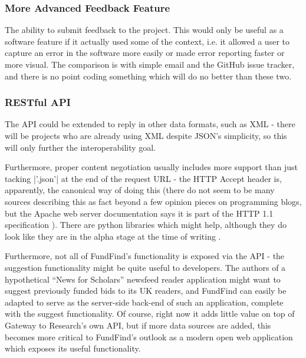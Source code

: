 \subsubsection{More Advanced Feedback Feature}
The ability to submit feedback to the project. This would only be useful as a software feature if it actually used some of the context, i.e. it allowed a user to capture an error in the software more easily or made error reporting faster or more visual. The comparison is with simple email and the GitHub issue tracker, and there is no point coding something which will do no better than these two.




\subsubsection{RESTful API}
\label{future-work-api}

The API could be extended to reply in other data formats, such as XML - there will be projects who are already using XML despite JSON's simplicity, so this will only further the interoperability goal.

Furthermore, proper content negotiation usually includes more support than just tacking |'.json'| at the end of the request URL - the HTTP Accept header is, apparently, the canonical way of doing this (there do not seem to be many sources describing this as fact beyond a few opinion pieces on programming blogs, but the Apache web server documentation says it is part of the HTTP 1.1 specification \cite{apache-content-negotiation}). There are python libraries which might help, although they do look like they are in the alpha stage at the time of writing \cite{negotiate} \cite{negotiator}.

Furthermore, not all of FundFind's functionality is exposed via the API - the suggestion functionality might be quite useful to developers. The authors of a hypothetical ``News for Scholars'' newsfeed reader application might want to suggest previously funded bids to its UK readers, and FundFind can easily be adapted to serve as the server-side back-end of such an application, complete with the suggest functionality. Of course, right now it adds little value on top of Gateway to Research's own API, but if more data sources are added, this becomes more critical to FundFind's outlook as a modern open web application which exposes its useful functionality.

